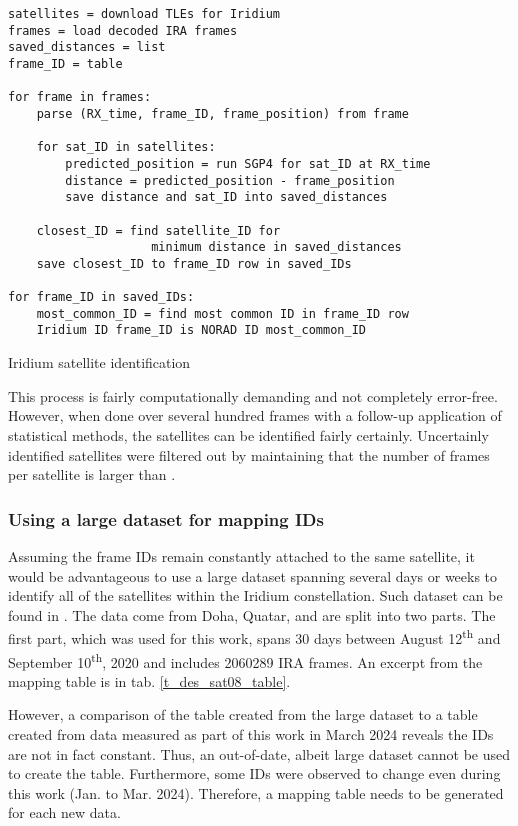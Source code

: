 \begin{algorithm}
    \centering
    \begin{verbatim}
satellites = download TLEs for Iridium
frames = load decoded IRA frames
saved_distances = list
frame_ID = table

for frame in frames:
    parse (RX_time, frame_ID, frame_position) from frame

    for sat_ID in satellites:
        predicted_position = run SGP4 for sat_ID at RX_time
        distance = predicted_position - frame_position
        save distance and sat_ID into saved_distances

    closest_ID = find satellite_ID for 
                    minimum distance in saved_distances
    save closest_ID to frame_ID row in saved_IDs

for frame_ID in saved_IDs:
    most_common_ID = find most common ID in frame_ID row
    Iridium ID frame_ID is NORAD ID most_common_ID
    \end{verbatim}
    \caption{Iridium satellite identification}
    \label{a_des_satellite_id}
\end{algorithm}


This process is fairly computationally demanding and not completely error-free. However, when done over several hundred frames with a follow-up application of statistical methods, the satellites can be identified fairly certainly. Uncertainly identified satellites were filtered out by maintaining that the number of frames per satellite is larger than .

\subsubsection{Using a large dataset for mapping IDs}
\label{s_des_sat08_id}
Assuming the frame IDs remain constantly attached to the same satellite, it would be advantageous to use a large dataset spanning several days or weeks to identify all of the satellites within the Iridium constellation. Such dataset can be found in \cite{sat08}. The data come from Doha, Quatar, and are split into two parts. The first part, which was used for this work, spans 30 days between August 12\textsuperscript{th} and September 10\textsuperscript{th}, 2020 and includes \num{2060289} IRA frames. An excerpt from the mapping table is in tab. \ref{t_des_sat08_table}.

However, a comparison of the table created from the large dataset to a table created from data measured as part of this work in March 2024 reveals the IDs are not in fact constant. Thus, an out-of-date, albeit large dataset cannot be used to create the table. Furthermore, some IDs were observed to change even during this work (Jan. to Mar. 2024). Therefore, a mapping table needs to be generated for each new data.

